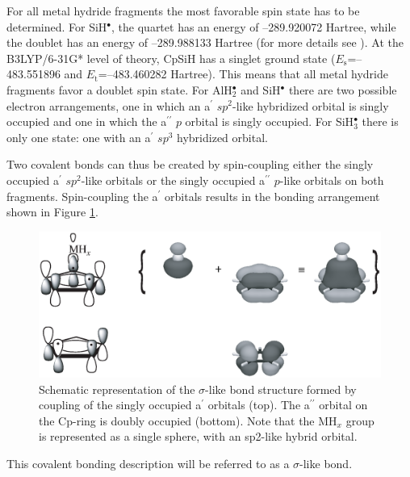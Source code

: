 For all metal hydride fragments the most favorable spin state has to be determined. For SiH$^\bullet$, the quartet has an energy of \mbox{--289.920072} Hartree, while the doublet has an energy of \mbox{--289.988133} Hartree (for more details see \cite{kalemos}). At the B3LYP/6-31G* level of theory, CpSiH has a singlet ground state ($E_\mathrm{s}$=\mbox{--483.551896} and $E_\mathrm{t}$=\mbox{--483.460282} Hartree). This means that all metal hydride fragments favor a doublet spin state. For AlH$_2^\bullet$ and SiH$^\bullet$ there are two possible electron arrangements, one in which an a$^\prime$ $sp^2$-like hybridized orbital is singly occupied and one in which the a$^{\prime\prime}$ $p$ orbital is singly occupied. For SiH$_3^\bullet$ there is only one state: one with an a$^\prime$ $sp^3$ hybridized orbital. 

Two covalent bonds can thus be created by spin-coupling either the singly occupied a$^\prime$ $sp^2$-like orbitals or the singly occupied a$^{\prime\prime}$ $p$-like orbitals on both fragments. Spin-coupling the a$^\prime$ orbitals results in the bonding arrangement shown in Figure \ref{ch4.fig.sigma}.
\begin{figure}[htbp]
\center
\includegraphics[scale=0.45]{cyclopentadienyl/figures/sigma.eps}
\caption{Schematic representation of the $\sigma$-like bond structure formed by coupling of the singly occupied a$^\prime$ orbitals (top). The a$^{\prime\prime}$ orbital on the Cp-ring is doubly occupied (bottom). Note that the MH$_x$ group is represented as a single sphere, with an sp2-like hybrid orbital.}
\label{ch4.fig.sigma}
\end{figure}
This covalent bonding description will be referred to as a $\sigma$-like bond.

